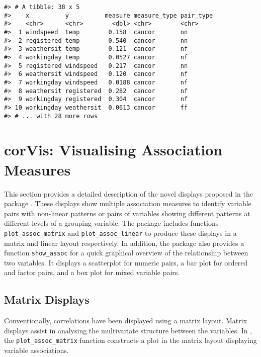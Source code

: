 \begin{verbatim}
#> # A tibble: 38 x 5
#>    x          y          measure measure_type pair_type
#>    <chr>      <chr>        <dbl> <chr>        <chr>    
#>  1 windspeed  temp        0.158  cancor       nn       
#>  2 registered temp        0.540  cancor       nn       
#>  3 weathersit temp        0.121  cancor       nf       
#>  4 workingday temp        0.0527 cancor       nf       
#>  5 registered windspeed   0.217  cancor       nn       
#>  6 weathersit windspeed   0.120  cancor       nf       
#>  7 workingday windspeed   0.0188 cancor       nf       
#>  8 weathersit registered  0.282  cancor       nf       
#>  9 workingday registered  0.304  cancor       nf       
#> 10 workingday weathersit  0.0613 cancor       ff       
#> # ... with 28 more rows
\end{verbatim}

\hypertarget{corvis-visualising-association-measures}{%
\section{corVis: Visualising Association Measures}\label{corvis-visualising-association-measures}}

This section provides a detailed description of the novel displays proposed in the package . These displays show multiple association measures to identify variable pairs with non-linear patterns or pairs of variables showing different patterns at different levels of a grouping variable. The package includes functions \texttt{plot\_assoc\_matrix} and \texttt{plot\_assoc\_linear} to produce these displays in a matrix and linear layout respectively. In addition, the package also provides a function \texttt{show\_assoc} for a quick graphical overview of the relationship between two variables. It displays a scatterplot for numeric pairs, a bar plot for ordered and factor pairs, and a box plot for mixed variable pairs.

\hypertarget{matrix-displays}{%
\subsection{Matrix Displays}\label{matrix-displays}}

Conventionally, correlations have been displayed using a matrix layout. Matrix displays assist in analysing the multivariate structure between the variables. In , the \texttt{plot\_assoc\_matrix} function constructs a plot in the matrix layout displaying variable associations.

